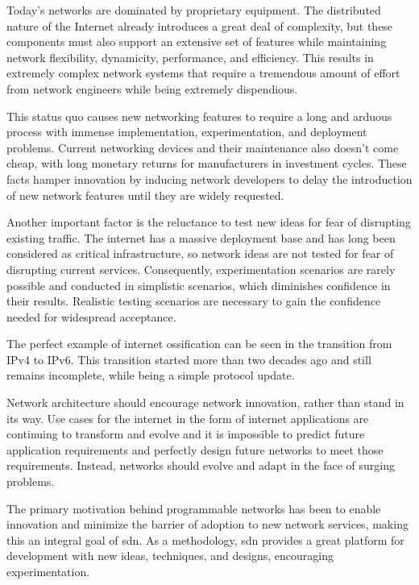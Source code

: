 Today's networks are dominated by proprietary equipment. The distributed nature of the Internet already introduces a great deal of complexity, but these components must also support an extensive set of features while maintaining network flexibility, dynamicity, performance, and efficiency\cite{feamster_road_2013}. This results in extremely complex network systems that require a tremendous amount of effort from network engineers while being extremely dispendious.

This status quo causes new networking features to require a long and arduous process with immense implementation, experimentation, and deployment problems. Current networking devices and their maintenance also doesn't come cheap, with long monetary returns for manufacturers in investment cycles. These facts hamper innovation by inducing network developers to delay the introduction of new network features until they are widely requested. \cite{bifulco_survey_2018}\cite{kreutz_software-defined_2015}

Another important factor is the reluctance to test new ideas for fear of disrupting existing traffic. The internet has a massive deployment base and has long been considered as critical infrastructure\cite{nunes_survey_2014}, so network ideas are not tested for fear of disrupting current services. Consequently, experimentation scenarios are rarely possible and conducted in simplistic scenarios, which diminishes confidence in their results\cite{xia_survey_2015}. Realistic testing scenarios are necessary to gain the confidence needed for widespread acceptance\cite{mckeown_openflow_2008}.

The perfect example of internet ossification can be seen in the transition from IPv4 to IPv6. This transition started more than two decades ago and still remains incomplete, while being a simple protocol update\cite{kreutz_software-defined_2015}.

Network architecture should encourage network innovation, rather than stand in its way. Use cases for the internet in the form of internet applications are continuing to transform and evolve and it is impossible to predict future application requirements and perfectly design future networks to meet those requirements. Instead, networks should evolve and adapt in the face of surging problems. \cite{xia_survey_2015}

The primary motivation behind programmable networks has been to enable innovation and minimize the barrier of adoption to new network services\cite{feamster_road_2013}, making this an integral goal of \gls{sdn}. As a methodology, \gls{sdn} provides a great platform for development with new ideas, techniques, and designs, encouraging experimentation.

